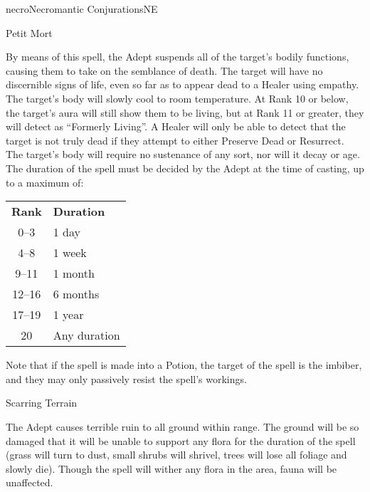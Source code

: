 \begin{college}[1.1]{necro}{Necromantic Conjurations}{NE}
\begin{spell}[S-10]{Petit Mort}
\begin{effects}
By means of this spell, the Adept suspends all of the target's bodily
functions, causing them to take on the semblance of death.  The target
will have no discernible signs of life, even so far as to appear dead
to a Healer using empathy.  The target's body will slowly cool to room
temperature.  At Rank 10 or below, the target's aura will still show
them to be living, but at Rank 11 or greater, they will detect as
``Formerly Living''.  A Healer will only be able to detect that the
target is not truly dead if they attempt to either Preserve Dead or
Resurrect.  The target's body will require no sustenance of any sort,
nor will it decay or age.  The duration of the spell must be decided
by the Adept at the time of casting, up to a maximum of:

\begin{tabular}{cl}
\textbf{Rank}	& \textbf{Duration} \\
0--3               &  1 day \\
4--8               &  1 week \\
9--11              &  1 month \\
12--16             &  6 months \\
17--19             &  1 year \\
20                 &  Any duration \\
\end{tabular}

Note that if the spell is made into a Potion, the target of the spell
is the imbiber, and they may only passively resist the spell's
workings.
\end{effects}
\end{spell}

\begin{spell}[S-11]{Scarring Terrain}

\begin{effects}
The Adept causes terrible ruin to all ground within range.  The ground
will be so damaged that it will be unable to support any flora for the
duration of the spell (grass will turn to dust, small shrubs will
shrivel, trees will lose all foliage and slowly die).  Though the
spell will wither any flora in the area, fauna will be unaffected.


\end{effects}
\end{spell}
\end{college}
